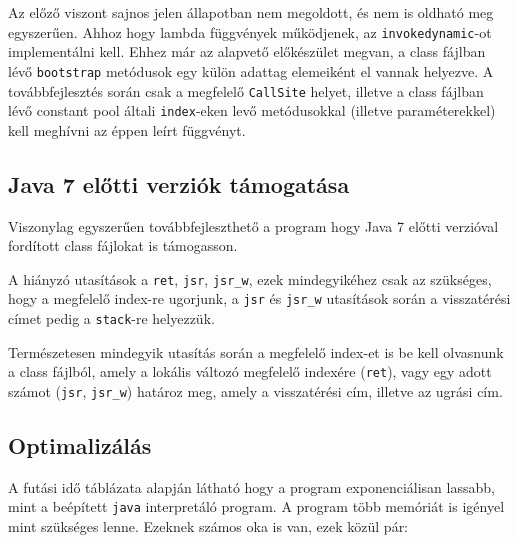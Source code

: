 Az előző viszont sajnos jelen állapotban nem megoldott, és nem is oldható meg egyszerűen. Ahhoz hogy lambda függvények működjenek, az \lstinline{invokedynamic}-ot implementálni kell. Ehhez már az alapvető előkészület megvan, a class fájlban lévő \lstinline{bootstrap} metódusok egy külön adattag elemeiként el vannak helyezve. A továbbfejlesztés során csak a megfelelő \lstinline{CallSite} helyet, illetve a class fájlban lévő constant pool általi \lstinline{index}-eken levő metódusokkal (illetve paraméterekkel) kell meghívni az éppen leírt függvényt.

\subsection{Java 7 előtti verziók támogatása}

Viszonylag egyszerűen továbbfejleszthető a program hogy Java 7 előtti verzióval fordított class fájlokat is támogasson.

A hiányzó utasítások a \lstinline{ret}, \lstinline{jsr}, \lstinline{jsr_w}, ezek mindegyikéhez csak az szükséges, hogy a megfelelő index-re ugorjunk, a \lstinline{jsr} és \lstinline{jsr_w} utasítások során a visszatérési címet pedig a \lstinline{stack}-re helyezzük.

Természetesen mindegyik utasítás során a megfelelő index-et is be kell olvasnunk a class fájlból, amely a lokális változó megfelelő indexére (\lstinline{ret}), vagy egy adott számot (\lstinline{jsr}, \lstinline{jsr_w}) határoz meg, amely a visszatérési cím, illetve az ugrási cím.

\subsection{Optimalizálás}

A futási idő táblázata alapján látható hogy a program exponenciálisan lassabb, mint a beépített \lstinline{java} interpretáló program. A program több memóriát is igényel mint szükséges lenne. Ezeknek számos oka is van, ezek közül pár:


